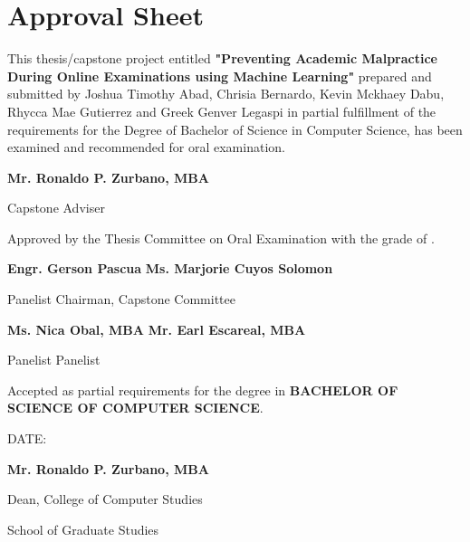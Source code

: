 \section*{\hfill Approval Sheet \hfill}

This thesis/capstone project entitled \textbf{"Preventing Academic Malpractice During Online Examinations using Machine Learning" }prepared and submitted by Joshua Timothy Abad, Chrisia Bernardo, Kevin Mckhaey Dabu, Rhycca Mae Gutierrez and Greek Genver Legaspi in partial fulfillment of the requirements for the Degree of Bachelor of Science in Computer Science, has been examined and recommended for oral examination.

\vspace{2em}

\begin{flushright}
   \textbf{Mr. Ronaldo P. Zurbano, MBA}

   Capstone Adviser
\end{flushright}

\vspace{2em}

\noindent
Approved by the Thesis Committee on Oral Examination with the grade of \makebox[1.0in]{\hrulefill}.

\vspace{2em}

\noindent \textbf{Engr. Gerson Pascua} \hfill \textbf{Ms. Marjorie Cuyos Solomon }

\noindent Panelist \hfill Chairman, Capstone Committee

\vspace{2em}

\noindent \textbf{Ms. Nica Obal, MBA} \hfill \textbf{Mr. Earl Escareal, MBA}

\noindent Panelist \hfill Panelist

\vspace{2em}

\noindent
Accepted as partial requirements for the degree in \textbf{BACHELOR OF SCIENCE OF COMPUTER SCIENCE}.

\noindent
DATE: \makebox[1.0in]{\hrulefill}

\vspace{2em}

\begin{flushright}
   \textbf{Mr. Ronaldo P. Zurbano, MBA}

   Dean, College of Computer Studies

   School of Graduate Studies
\end{flushright}
